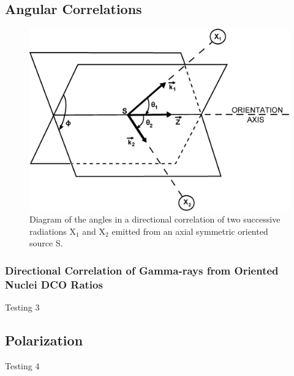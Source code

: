 \subsection{Angular Correlations}
\label{ssec:exp-pr-data-ang-cor}
\begin{figure}[h!]
	\centerline{\includegraphics[height=0.35\textheight]{./img/c3/dco_setup.eps}}
	\caption{Diagram of the angles in a directional correlation of two successive radiations X$_{1}$ and X$_{2}$ emitted from an axial symmetric oriented source S.}
	\label{fig:chp3-DCO-Angles}
\end{figure}
\subsubsection{Directional Correlation of Gamma-rays from Oriented Nuclei DCO Ratios}
\label{sssec:exp-pr-data-ang-cor-dco}
Testing 3
\subsection{Polarization}
\label{ssec:exp-pr-data-ang-pol}
Testing 4